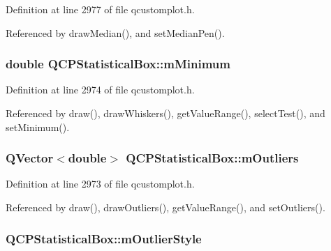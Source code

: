 Definition at line 2977 of file qcustomplot.\+h.



Referenced by draw\+Median(), and set\+Median\+Pen().

\hypertarget{class_q_c_p_statistical_box_a7143ece4e7e5f9ac010739fbc390bf0c}{}
\subsubsection[{m\+Minimum}]{\setlength{\rightskip}{0pt plus 5cm}double Q\+C\+P\+Statistical\+Box\+::m\+Minimum\hspace{0.3cm}{\ttfamily [protected]}}\label{class_q_c_p_statistical_box_a7143ece4e7e5f9ac010739fbc390bf0c}


Definition at line 2974 of file qcustomplot.\+h.



Referenced by draw(), draw\+Whiskers(), get\+Value\+Range(), select\+Test(), and set\+Minimum().

\hypertarget{class_q_c_p_statistical_box_a415e2f77a89396c2af999afe027bdf6c}{}
\subsubsection[{m\+Outliers}]{\setlength{\rightskip}{0pt plus 5cm}Q\+Vector$<$double$>$ Q\+C\+P\+Statistical\+Box\+::m\+Outliers\hspace{0.3cm}{\ttfamily [protected]}}\label{class_q_c_p_statistical_box_a415e2f77a89396c2af999afe027bdf6c}


Definition at line 2973 of file qcustomplot.\+h.



Referenced by draw(), draw\+Outliers(), get\+Value\+Range(), and set\+Outliers().

\hypertarget{class_q_c_p_statistical_box_ae102e4187e1e6ba1f2df0f622b5171a4}{}
\subsubsection[{m\+Outlier\+Style}]{ Q\+C\+P\+Statistical\+Box\+::m\+Outlier\+Style\hspace{0.3cm}{\ttfamily [protected]}}\label{class_q_c_p_statistical_box_ae102e4187e1e6ba1f2df0f622b5171a4}



